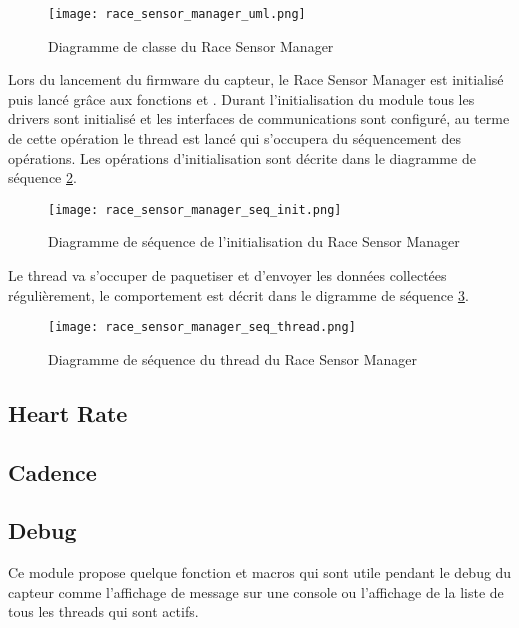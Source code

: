 \begin{figure}[htb]
\centering 
\texttt{[image: race\_sensor\_manager\_uml.png]} 
\caption{Diagramme de classe du Race Sensor Manager}
\label{fig:race_sensor_manager_uml}
\end{figure}

Lors du lancement du firmware du capteur, le Race Sensor Manager est initialisé puis lancé grâce aux fonctions  et . Durant l'initialisation du module tous les drivers sont initialisé et les interfaces de communications sont configuré, au terme de cette opération le thread est lancé qui s'occupera du séquencement des opérations. Les opérations d'initialisation sont décrite dans le diagramme de séquence \ref{fig:race_sensor_manager_init_seq}.

\begin{figure}[htb]
\centering 
\texttt{[image: race\_sensor\_manager\_seq\_init.png]} 
\caption{Diagramme de séquence de l'initialisation du Race Sensor Manager}
\label{fig:race_sensor_manager_init_seq}
\end{figure}

Le thread va s'occuper de paquetiser et d'envoyer les données collectées régulièrement, le comportement est décrit dans le digramme de séquence \ref{fig:race_sensor_manager_init_thread}.

\begin{figure}[htb]
\centering 
\texttt{[image: race\_sensor\_manager\_seq\_thread.png]} 
\caption{Diagramme de séquence du thread du Race Sensor Manager}
\label{fig:race_sensor_manager_init_thread}
\end{figure}

\subsection{Heart Rate}

\todo{}

\subsection{Cadence}

\todo{}

\subsection{Debug}

Ce module propose quelque fonction et macros qui sont utile pendant le debug du capteur comme l'affichage de message sur une console ou l'affichage de la liste de tous les threads qui sont actifs.


